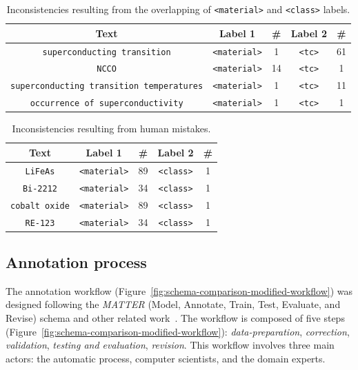 \begin{table}[ht]
     \caption{Inconsistencies resulting from the overlapping of \texttt{<material>} and \texttt{<class>} labels.}
     
    \begin{tabular}{ ccccc } 
    \toprule
        Text & Label 1 & \# & Label 2 & \#\\
    \midrule
        \texttt{superconducting transition}     &   \texttt{<material>}   &    1   &   \texttt{<tc>}  &   61   \\
        \texttt{NCCO}    &	\texttt{<material>}   &    14   &   \texttt{<tc>}  &   1   \\
        \texttt{superconducting transition temperatures}     &   \texttt{<material>}   &    1   &   \texttt{<tc>}  &   11   \\
        \texttt{occurrence of superconductivity}    &	\texttt{<material>}   &    1   &   \texttt{<tc>}  &   1   \\
    \bottomrule
    \end{tabular}
    \label{table:dataset-inconsistencies-unclear}
\end{table}

\begin{table}[ht]
    \caption{Inconsistencies resulting from human mistakes.}
    \begin{tabular}{ ccccc } 
    \toprule
        Text & Label 1 & \# & Label 2 & \#\\
    \midrule
        \texttt{LiFeAs}         &   \texttt{<material>}   &    89   &   \texttt{<class>}  &   1   \\
        \texttt{Bi-2212}        &	\texttt{<material>}   &    34   &   \texttt{<class>}  &   1   \\
        \texttt{cobalt oxide}   &   \texttt{<material>}   &    89   &   \texttt{<class>}  &   1   \\
        \texttt{RE-123}         &	\texttt{<material>}   &    34   &   \texttt{<class>}  &   1   \\
    \bottomrule
    \end{tabular}
    \label{table:dataset-inconsistencies-clear}
\end{table}



\subsection{Annotation process}
\label{subsec:annotation-workflow}
The annotation workflow (Figure~\ref{fig:schema-comparison-modified-workflow}) was designed following the \textit{MATTER} (Model, Annotate, Train, Test, Evaluate, and Revise) schema\cite{pustejovsky2012natural} and other related work~\cite{Dieb2016, Krallinger2015TheCC}.
The workflow is composed of five steps (Figure~\ref{fig:schema-comparison-modified-workflow}): \textit{data-preparation}, \textit{correction}, \textit{validation}, \textit{testing and evaluation}, \textit{revision}. 
This workflow involves three main actors: the automatic process, computer scientists, and the domain experts.


